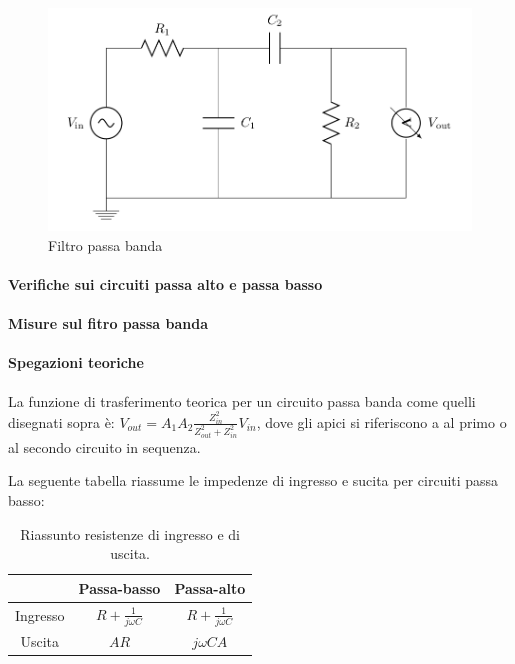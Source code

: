 \documentclass[10pt,a4paper]{article}
\begin{document}
\begin{figure}[h]
\centering
\includegraphics[scale=0.4]{passabanda.png}
\caption{Filtro passa banda}
\end{figure}

\paragraph{Verifiche sui circuiti passa alto e passa basso}

\paragraph{Misure sul fitro passa banda}

\paragraph{Spegazioni teoriche}
La funzione di trasferimento teorica per un circuito passa banda come quelli disegnati sopra è: 
$V_{out} = A_{1} A_{2} \frac{Z_{in}^2}{Z_{out}^2+Z_{in}^2} V_{in}$, dove gli apici si riferiscono a al primo o al secondo circuito in sequenza. 

La seguente tabella riassume le impedenze di ingresso e sucita per circuiti passa basso:

\begin{table}[h]
\centering
\begin{tabular}{|c|c|c|}
\hline 
 & Passa-basso  & Passa-alto \\
\hline 
Ingresso & $R+\frac{1}{j \omega C}$ & $R+\frac{1}{j \omega C}$\\ 
Uscita & $AR$ & $j \omega C A$\\
\hline 
\end{tabular} 
\caption{Riassunto resistenze di ingresso e di uscita.}
\end{table}
\end{document}
